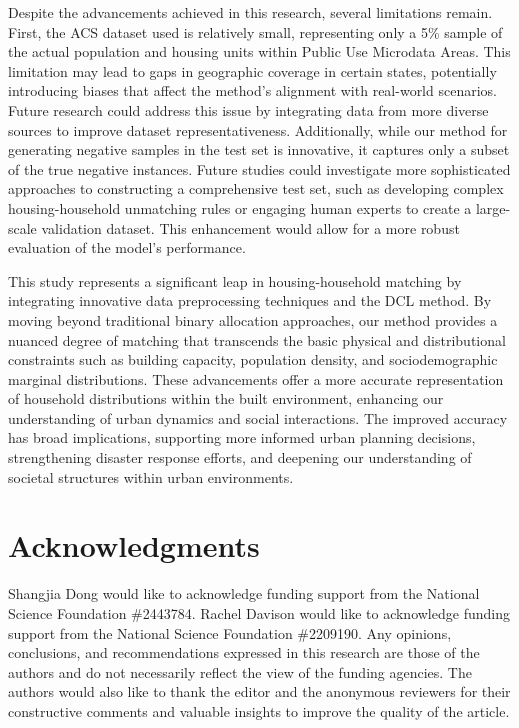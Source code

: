 \documentclass[]{nature_mod}
\begin{document}
Despite the advancements achieved in this research, several limitations remain. First, the ACS dataset used is relatively small, representing only a 5\% sample of the actual population and housing units within Public Use Microdata Areas. This limitation may lead to gaps in geographic coverage in certain states, potentially introducing biases that affect the method's alignment with real-world scenarios. Future research could address this issue by integrating data from more diverse sources to improve dataset representativeness. Additionally, while our method for generating negative samples in the test set is innovative, it captures only a subset of the true negative instances. Future studies could investigate more sophisticated approaches to constructing a comprehensive test set, such as developing complex housing-household unmatching rules or engaging human experts to create a large-scale validation dataset. This enhancement would allow for a more robust evaluation of the model's performance.

This study represents a significant leap in housing-household matching by integrating innovative data preprocessing techniques and the DCL method. By moving beyond traditional binary allocation approaches, our method provides a nuanced degree of matching that transcends the basic physical and distributional constraints such as building capacity, population density, and sociodemographic marginal distributions. These advancements offer a more accurate representation of household distributions within the built environment, enhancing our understanding of urban dynamics and social interactions. The improved accuracy has broad implications, supporting more informed urban planning decisions, strengthening disaster response efforts, and deepening our understanding of societal structures within urban environments.


\section*{Acknowledgments}
Shangjia Dong would like to acknowledge funding support from the National Science Foundation \#2443784. Rachel Davison would like to acknowledge funding support from the National Science Foundation \#2209190. Any opinions, conclusions, and recommendations expressed in this research are those of the authors and do not necessarily reflect the view of the funding agencies. The authors would also like to thank the editor and the anonymous reviewers for their constructive comments and valuable insights to improve the quality of the article. 


\label{sec:refs}
\end{document}
